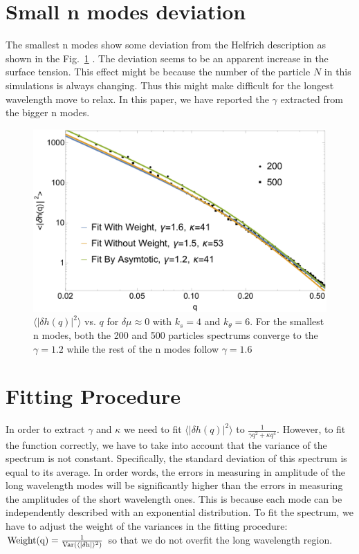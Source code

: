 \documentclass[amsmath,preprintnumbers,10pt,nofootinbib,prl,twocolumn]{revtex4-1}
\begin{document}
\section{Small n modes deviation}
The smallest n modes show some deviation from the Helfrich description as shown in the Fig.~\ref{fig:fit} . The deviation seems to be an apparent increase in the surface tension. This effect might be because the number of the particle $N$ in this simulations is always changing. Thus this might make difficult for the longest wavelength move to relax. In this paper, we have reported the $\gamma$ extracted from the bigger n modes. 
\begin{figure}[tbb]
\centering
\includegraphics[scale=0.30]{fittingandsmallneffect.pdf}
\caption{$\langle|\delta h(q)|^2\rangle$ vs. $q$ for $\delta \mu \approx 0$ with $k_s=4$ and $k_\theta = 6$. For the smallest n modes, both the 200 and 500 particles spectrums converge to the $\gamma=1.2$ while the rest of the n modes follow $\gamma=1.6$ } \label{fig:fit}
\end{figure}
\section{Fitting Procedure}
In order to extract $\gamma$ and $\kappa$ we need to fit $\langle|\delta h(q)|^2\rangle$ to $\frac{1}{\gamma q^2 +\kappa q^4}$. However, to fit the function correctly, we have to take into account that the variance of the spectrum is not constant. Specifically, the standard deviation of this spectrum is equal to its average. In order words, the errors in measuring in amplitude of the long wavelength modes will be significantly higher than the errors in measuring the amplitudes of the short wavelength ones. This is because each mode can be independently described with an exponential distribution. To fit the spectrum, we have to adjust the weight of the variances in the fitting procedure: $\rm{Weight(q)} = \frac{1}{\rm{Var(\langle|\delta h|\rangle ^2)}}$ so that we do not overfit the long wavelength region.
\end{document}
